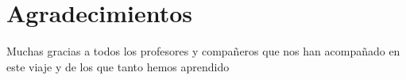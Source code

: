 
\chapter*{Agradecimientos}

Muchas gracias a todos los profesores y compañeros que nos han acompañado en este viaje y de los que tanto hemos aprendido











